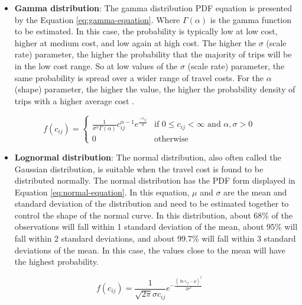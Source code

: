 \documentclass[preprint, 3p,
authoryear]{elsarticle} %
\providecommand{\tightlist}{%
  \setlength{\itemsep}{0pt}\setlength{\parskip}{0pt}}
\begin{document}
\begin{itemize}
\tightlist
\item
  \textbf{Gamma distribution}: The gamma distribution PDF equation is
  presented by the Equation \ref{eq:gamma-equation}. Where
  \(\Gamma(\alpha)\) is the gamma function to be estimated. In this
  case, the probability is typically low at low cost, higher at medium
  cost, and low again at high cost. The higher the \(\sigma\) (scale
  rate) parameter, the higher the probability that the majority of trips
  will be in the low cost range. So at low values of the \(\sigma\)
  (scale rate) parameter, the same probability is spread over a wider
  range of travel costs. For the \(\alpha\) (shape) parameter, the
  higher the value, the higher the probability density of trips with a
  higher average cost \citep{soukhov2024}.
\end{itemize}

\begin{equation}
f(c_{ij}) = 
   \begin{cases}
\frac{1}{\sigma^\alpha\Gamma(\alpha)} c_{ij}^{\alpha-1} e^{\frac{-c_{ij}}{\sigma}} & \text{if } 0 \leq c_{ij} <      \infty  \text{ and } \alpha, \sigma > 0 \\ 0 & \text{otherwise}
   \end{cases}
\label{eq:gamma-equation}
\end{equation}

\begin{itemize}
\tightlist
\item
  \textbf{Lognormal distribution}: The normal distribution, also often
  called the Gaussian distribution, is suitable when the travel cost is
  found to be distributed normally. The normal distribution has the PDF
  form displayed in Equation \ref{eq:normal-equation}. In this equation,
  \(\mu\) and \(\sigma\) are the mean and standard deviation of the
  distribution and need to be estimated together to control the shape of
  the normal curve. In this distribution, about 68\% of the observations
  will fall within 1 standard deviation of the mean, about 95\% will
  fall within 2 standard deviations, and about 99.7\% will fall within 3
  standard deviations of the mean. In this case, the values close to the
  mean will have the highest probability.
\end{itemize}

\begin{equation}
f(c_{ij}) = \frac{1}{\sqrt{2\pi} \sigma c_{ij}} e^{-\frac{(\ln c_{ij} - \mu)^2}{2\sigma^2}}
\label{eq:normal-equation}
\end{equation}
\end{document}

